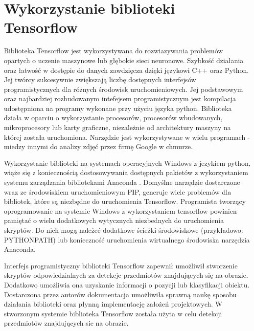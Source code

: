 \section{Wykorzystanie biblioteki Tensorflow}{
Biblioteka Tensorflow \cite{Tensorflow} jest wykorzystywana do rozwiazywania problemów opartych o uczenie maszynowe lub głębokie sieci neuronowe. Szybkość działania oraz łatwość w dostępie do danych zawdzięcza dzięki językowi C++ oraz Python. Jej twórcy sukcesywnie zwiększają liczbę dostępnych interfejsów programistycznych dla różnych środowisk uruchomieniowych. Jej podstawowym oraz najbardziej rozbudowanym intefejsem programistycznym jest kompilacja udostępniona na programy wykonane przy użyciu języka python. Biblioteka działa w oparciu o wykorzystanie procesorów, procesorów wbudowanych, mikroprocesory lub karty graficzne, niezależnie od architektury maszyny na której została uruchomiona. Narzędzie jest wykorzystywane w wielu programach - miedzy innymi do analizy zdjęć przez firmę Google w chmurze. 

Wykorzystanie biblioteki na systemach operacyjnych Windows z jezykiem python, wiąże się z koniecznością dostosowywania dostępnych pakietów z wykorzystaniem systemu zarządzania bibliotekami Anaconda \cite{Anaconda}. Domyślne narzędzie dostarczone wraz ze środowiskiem uruchomieniowym PIP, generuje wiele problemów dla bibliotek, które są niezbędne do uruchomienia Tensorflow. Programista tworzący oprogramowanie na systemie Windows z wykorzystaniem tensorflow powinien pamiętać o wielu dodatkowych wytycznych niezbednych do uruchomienia skryptów. Do nich mogą należeć dodatkowe ścieżki środowiskowe (przykładowo: PYTHONPATH) lub konieczność uruchomienia wirtualnego środowiska narzędzia Anaconda. 

Interfejs programistyczny biblioteki Tensorflow zapewnił umożliwił stworzenie skryptów odpowiedzialnych za detekcje przedmiotów znajdujących się na obrazie. Dodatkowo umożliwia ona uzyskanie informacji o pozycji lub klasyfikacji obiektu. Dostarczona przez autorów dokumentacja umożliwiła sprawną naukę sposobu działania biblioteki oraz płynną implementację założeń projektowych. W stworzonym systemie biblioteka Tensorflow została użyta w celu detekcji przedmiotów znajdujących sie na obrazie.
}
